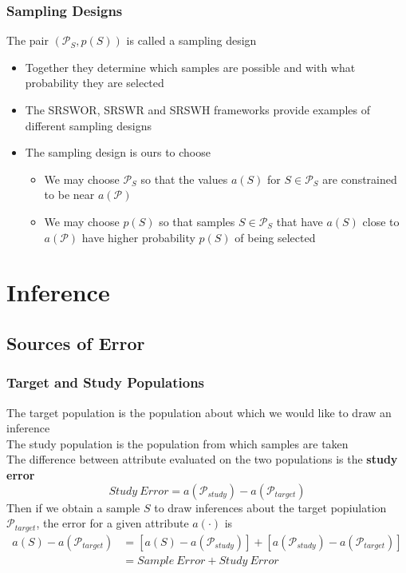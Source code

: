 \documentclass[11pt]{article}
\begin{document}
\subsubsection{Sampling Designs}
The pair $(\mathcal{P}_S,p(S))$ is called a sampling design 
\begin{itemize}
    \item Together they determine which samples are possible and with what probability they are selected 
    \item The SRSWOR, SRSWR and SRSWH frameworks provide examples of different sampling designs 
    \item The sampling design is ours to choose 
    \begin{itemize}
        \item We may choose $\mathcal{P}_S$ so that the values $a(S)$ for $S\in\mathcal{P}_S$ are constrained to be near $a(\mathcal{P})$ 
        \item We may choose $p(S)$ so that samples $S\in\mathcal{P}_S$ that have $a(S)$ close to $a(\mathcal{P})$ have higher probability $p(S)$ of being selected 
    \end{itemize}
\end{itemize}

\newpage 
\section{Inference}
\subsection{Sources of Error}
\subsubsection{Target and Study Populations}
The target population is the population about which we would like to draw an inference \\
The study population is the population from which samples are taken \\
The difference between attribute evaluated on the two populations is the \textbf{study error}
\[Study\ Error = a(\mathcal{P}_{study}) - a(\mathcal{P}_{target})\]
Then if we obtain a sample $S$ to draw inferences about the target popiulation $\mathcal{P}_{target}$, the error for a 
given attribute $a(\cdot)$ is 
\begin{align*}
    a(S) - a(\mathcal{P}_{target}) &= [a(S) - a(\mathcal{P}_{study})] + [a(\mathcal{P}_{study}) - a(\mathcal{P}_{target})] \\
    &= Sample\ Error + Study\ Error
\end{align*}
\end{document}
